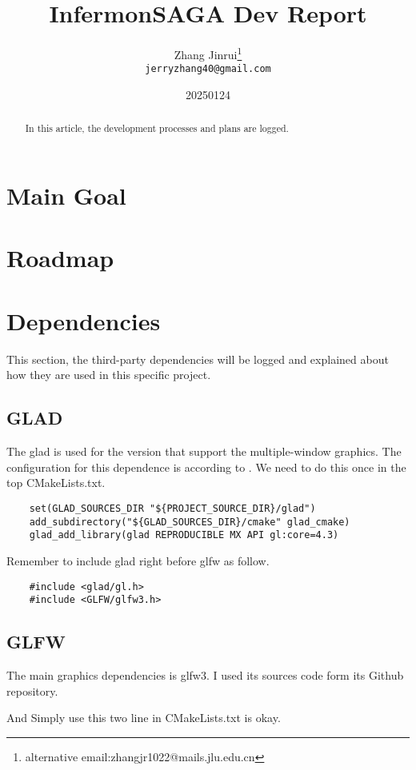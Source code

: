\documentclass{article}
\title{InfermonSAGA Dev Report}
\author{Zhang Jinrui\thanks{alternative email:zhangjr1022@mails.jlu.edu.cn} \\ \texttt{jerryzhang40@gmail.com}}
\date{20250124}  %
\theoremstyle{definition} %
\begin{document}
\maketitle

\begin{abstract}
    In this article, the development processes
    and plans are logged.
\end{abstract}

\section{Main Goal}
\section{Roadmap}
\section[deps]{Dependencies}
This section, the third-party dependencies
will be logged and explained about how they
are used in this specific project.
\subsection[GLAD]{GLAD}
The glad is used for the version that support
the multiple-window graphics. The configuration
for this dependence is according to
\cite[gladMultiwinMx]{GLAD_multiwin_mx}. We
need to do this once in the top CMakeLists.txt.

\begin{verbatim}
    set(GLAD_SOURCES_DIR "${PROJECT_SOURCE_DIR}/glad")
    add_subdirectory("${GLAD_SOURCES_DIR}/cmake" glad_cmake)
    glad_add_library(glad REPRODUCIBLE MX API gl:core=4.3)
\end{verbatim}

Remember to include glad right before glfw as
follow.

\begin{verbatim}
    #include <glad/gl.h>
    #include <GLFW/glfw3.h>
\end{verbatim}

\subsection[GLFW]{GLFW}
The main graphics dependencies is glfw3.
I used its sources code form its Github
repository.

And Simply use this two line in CMakeLists.txt
is okay.
\end{document}
